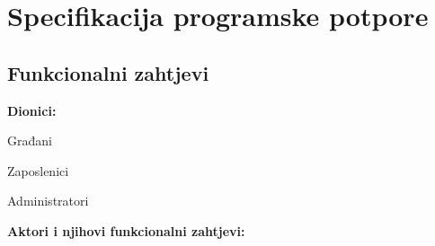 \chapter{Specifikacija programske potpore}
		
	\section{Funkcionalni zahtjevi}	
			
			\noindent \textbf{Dionici:}
			
			\begin{packed_enum}
				
				\item Građani
				\item Zaposlenici				
				\item Administratori
				
			\end{packed_enum}
			
			\noindent \textbf{Aktori i njihovi funkcionalni zahtjevi:}
			
